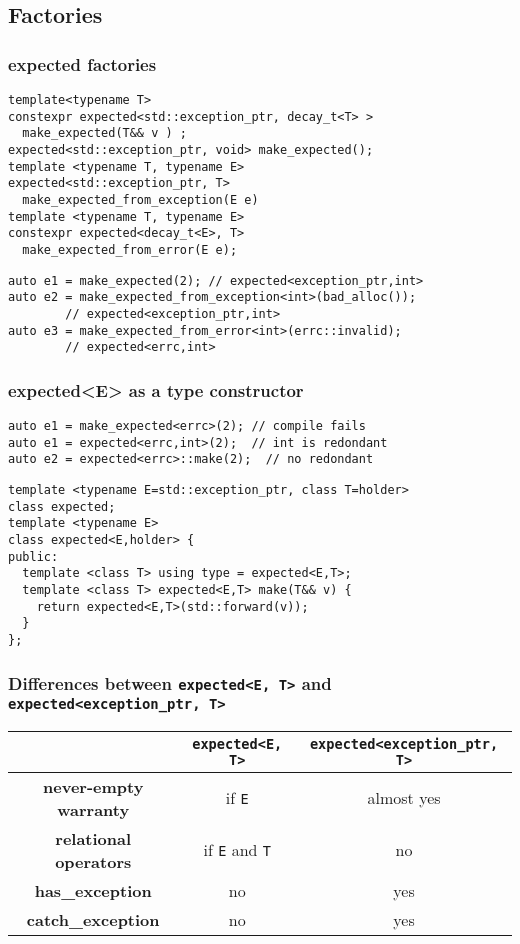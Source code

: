 \documentclass[xcolor=dvipsnames]{beamer}
\newcommand{\cpp}[1]{\lstinline{#1}}
\begin{document}
\subsection{Factories}
\begin{frame}[fragile]
\frametitle{expected factories}

\begin{lstlisting}
template<typename T>
constexpr expected<std::exception_ptr, decay_t<T> > 
  make_expected(T&& v ) ;
expected<std::exception_ptr, void> make_expected();
template <typename T, typename E>
expected<std::exception_ptr, T> 
  make_expected_from_exception(E e)
template <typename T, typename E>
constexpr expected<decay_t<E>, T> 
  make_expected_from_error(E e);
\end{lstlisting}

\begin{lstlisting}
auto e1 = make_expected(2); // expected<exception_ptr,int>
auto e2 = make_expected_from_exception<int>(bad_alloc()); 
		// expected<exception_ptr,int>
auto e3 = make_expected_from_error<int>(errc::invalid); 
		// expected<errc,int>
\end{lstlisting}
\end{frame}
\begin{frame}[fragile]
\frametitle{expected<E> as a type constructor}

\begin{lstlisting}
auto e1 = make_expected<errc>(2); // compile fails
auto e1 = expected<errc,int>(2);  // int is redondant
auto e2 = expected<errc>::make(2);  // no redondant
\end{lstlisting}

\begin{lstlisting}
template <typename E=std::exception_ptr, class T=holder>
class expected;
template <typename E>
class expected<E,holder> {
public:
  template <class T> using type = expected<E,T>;
  template <class T> expected<E,T> make(T&& v) {
    return expected<E,T>(std::forward(v));
  }
};
\end{lstlisting}
\end{frame}
\begin{frame}[fragile]
\frametitle{Differences between \cpp{expected<E, T>} and \cpp{expected<exception_ptr, T>}}

\begin{tabular}{|c|c|c|}
\hline
                    & \cpp{expected<E, T>} & \cpp{expected<exception_ptr, T>}  \\
\hline
\textbf{never-empty warranty} & if \cpp{E} & almost yes \\
\hline
\textbf{relational operators} & if \cpp{E} and \cpp{T} & no \\
\hline
\textbf{has\_exception} & no & yes \\
\hline
\textbf{catch\_exception} & no & yes \\
\hline
\end{tabular}
\end{frame}
\end{document}
